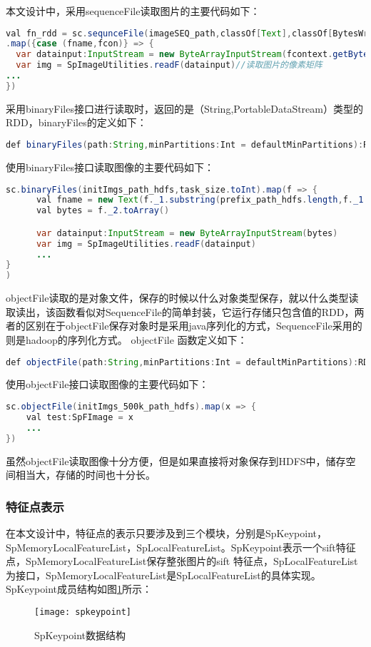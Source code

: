 本文设计中，采用sequenceFile读取图片的主要代码如下：
\begin{lstlisting}[language=Java,numbers=none,frame=none]
val fn_rdd = sc.sequnceFile(imageSEQ_path,classOf[Text],classOf[BytesWritable],task_size.toInt)
.map({case (fname,fcon)} => {
  var datainput:InputStream = new ByteArrayInputStream(fcontext.getBytes)
  var img = SpImageUtilities.readF(datainput)//读取图片的像素矩阵
...
})
\end{lstlisting}
采用binaryFiles接口进行读取时，返回的是（String,PortableDataStream）类型的RDD，binaryFiles的定义如下：
\begin{lstlisting}[language=Java,numbers=none,frame=none]
def binaryFiles(path:String,minPartitions:Int = defaultMinPartitions):RDD[(String,PortableDataStream)]=withScope{}
\end{lstlisting}
使用binaryFiles接口读取图像的主要代码如下：
\begin{lstlisting}[language=Java,numbers=none,frame=none]
 sc.binaryFiles(initImgs_path_hdfs,task_size.toInt).map(f => {
      val fname = new Text(f._1.substring(prefix_path_hdfs.length,f._1.length))//获取features key
      val bytes = f._2.toArray()

      var datainput:InputStream = new ByteArrayInputStream(bytes)
      var img = SpImageUtilities.readF(datainput)
      ...
}
)
\end{lstlisting}
objectFile读取的是对象文件，保存的时候以什么对象类型保存，就以什么类型读取读出，该函数看似对SequenceFile的简单封装，它运行存储只包含值的RDD，两者的区别在于objectFile保存对象时是采用java序列化的方式，SequenceFile采用的则是hadoop的序列化方式。 objectFile 函数定义如下：
\begin{lstlisting}[language=Java,numbers=none,frame=none]
def objectFile(path:String,minPartitions:Int = defaultMinPartitions):RDD[T]=withScope{}
\end{lstlisting}
使用objectFile接口读取图像的主要代码如下：
\begin{lstlisting}[language=Java,numbers=none,frame=none]
sc.objectFile(initImgs_500k_path_hdfs).map(x => {
    val test:SpFImage = x
    ...
})
\end{lstlisting}
虽然objectFile读取图像十分方便，但是如果直接将对象保存到HDFS中，储存空间相当大，存储的时间也十分长。
\subsubsection{特征点表示}
在本文设计中，特征点的表示只要涉及到三个模块，分别是SpKeypoint，SpMemoryLocalFeatureList，SpLocalFeatureList。SpKeypoint表示一个sift特征点，SpMemoryLocalFeatureList保存整张图片的sift 特征点，SpLocalFeatureList为接口，SpMemoryLocalFeatureList是SpLocalFeatureList的具体实现。SpKeypoint成员结构如图\ref{fig:spkeypoint}所示：
\begin{figure}[htp]
\centering
\texttt{[image: spkeypoint]}
\caption{SpKeypoint数据结构}
\label{fig:spkeypoint}
\end{figure}

